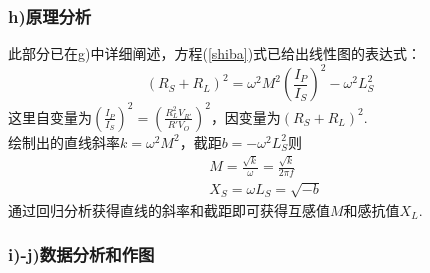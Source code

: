 \documentclass[UTF8]{ctexart}
\begin{document}
\subsubsection*{h)原理分析}
此部分已在g)中详细阐述，方程(\ref{shiba})式已给出线性图的表达式：
\[    (R_S+R_L)^2=\omega^2  M^2 (\frac{I_P}{I_S})^2-\omega^2L_S^2\]
这里自变量为$\displaystyle{(\frac{I_P}{I_S})^2=(\frac{R_L^2V_{R'}}{R'V_O})^2}$，因变量为$(R_S+R_L)^2$. \\
绘制出的直线斜率$\displaystyle{k=\omega^2 M^2}$，截距$b=-\omega^2L_S^2$则
\begin{equation}
    \begin{aligned}
&M=\frac{\sqrt{k}}{\omega}=\frac{\sqrt{k}}{2\pi f}\\
&X_S=\omega L_S=\sqrt{-b}
    \end{aligned}
\end{equation}
通过回归分析获得直线的斜率和截距即可获得互感值$M$和感抗值$X_L$.

\subsubsection*{i)-j)数据分析和作图}
\end{document}
